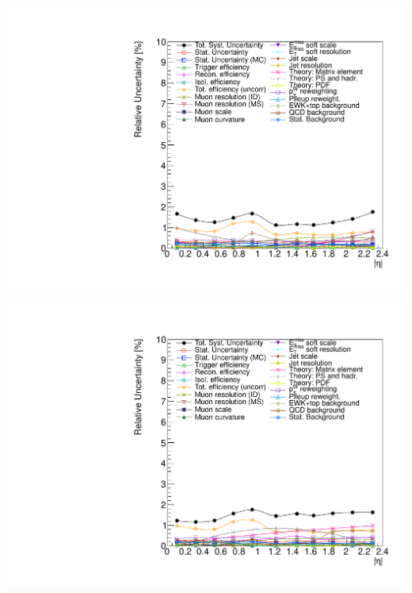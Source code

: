 {
\colb[T]
\centering
{}
\includegraphics[width=1.0\textwidth]{dates/20130602/figures/v26.allqcd/Wmn_SYSTEM_2D_PT20_NEG_Unc_2d_Slice_3}

\centering
{}
\includegraphics[width=1.0\textwidth]{dates/20130602/figures/v26.allqcd/Wmn_SYSTEM_2D_PT20_POS_Unc_2d_Slice_3}
\cole
}

